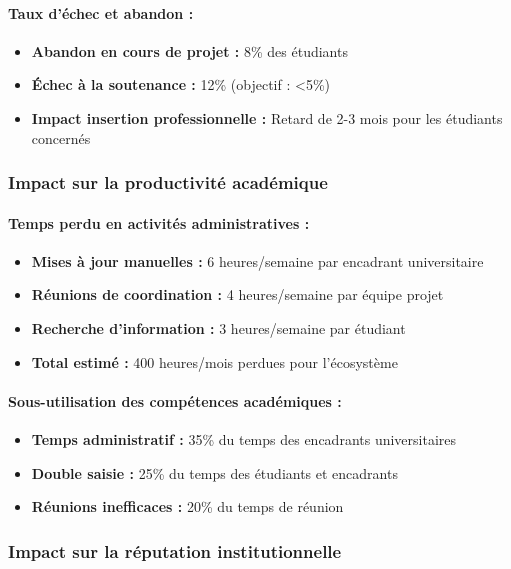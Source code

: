 \paragraph{Taux d'échec et abandon :}
\begin{itemize}
    \item \textbf{Abandon en cours de projet :} 8\% des étudiants
    \item \textbf{Échec à la soutenance :} 12\% (objectif : <5\%)
    \item \textbf{Impact insertion professionnelle :} Retard de 2-3 mois pour les étudiants concernés
\end{itemize}

\subsubsection{Impact sur la productivité académique}

\paragraph{Temps perdu en activités administratives :}
\begin{itemize}
    \item \textbf{Mises à jour manuelles :} 6 heures/semaine par encadrant universitaire
    \item \textbf{Réunions de coordination :} 4 heures/semaine par équipe projet
    \item \textbf{Recherche d'information :} 3 heures/semaine par étudiant
    \item \textbf{Total estimé :} 400 heures/mois perdues pour l'écosystème
\end{itemize}

\paragraph{Sous-utilisation des compétences académiques :}
\begin{itemize}
    \item \textbf{Temps administratif :} 35\% du temps des encadrants universitaires
    \item \textbf{Double saisie :} 25\% du temps des étudiants et encadrants
    \item \textbf{Réunions inefficaces :} 20\% du temps de réunion
\end{itemize}

\subsubsection{Impact sur la réputation institutionnelle}

